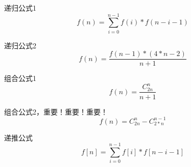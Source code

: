 递归公式1
\begin{displaymath}
f(n)=\sum_{i=0}^{n-1}f(i)*f(n-i-1)
\end{displaymath}

递归公式2
\begin{displaymath}
f(n)=\frac{f(n-1)*(4*n-2)}{n+1}
\end{displaymath}

组合公式1
\begin{displaymath}
f(n)=\frac{C_{2n}^n}{n+1}
\end{displaymath}

组合公式2，重要！重要！重要！
\begin{displaymath}
f(n)=C_{2n}^n-C_{2*n}^{n-1}
\end{displaymath}

递推公式
\begin{displaymath}
f[n]=\sum_{i=0}^{n-1}f[i]*f[n-i-1]
\end{displaymath}